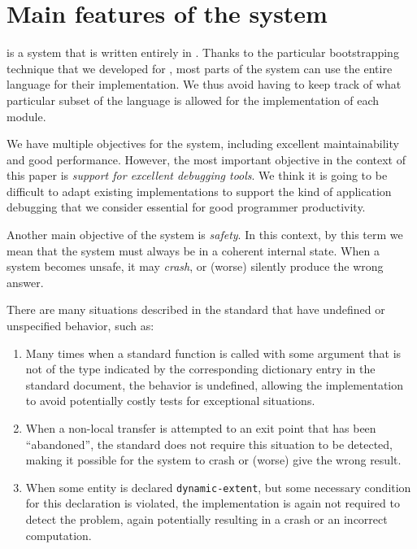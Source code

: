 \section{Main features of the \sicl{} system}
\label{sec-sicl-features}

\sicl{} is a system that is written entirely in \commonlisp{}.  Thanks
to the particular bootstrapping technique
\cite{durand_irene_2019_2634314} that we developed for \sicl{}, most
parts of the system can use the entire language for their
implementation.  We thus avoid having to keep track of what particular
subset of the language is allowed for the implementation of each
module.

We have multiple objectives for the \sicl{} system, including
excellent maintainability and good performance.  However, the most
important objective in the context of this paper is \emph{support for
  excellent debugging tools}.  We think it is going to be difficult to
adapt existing \commonlisp{} implementations to support the kind of
application debugging that we consider essential for good programmer
productivity.

Another main objective of the \sicl{} system is \emph{safety}.  In
this context, by this term we mean that the system must always be in a
coherent internal state.  When a system becomes unsafe, it may
\emph{crash}, or (worse) silently produce the wrong answer.

There are many situations described in the \commonlisp{} standard that
have undefined or unspecified behavior, such as:

\begin{enumerate}
\item Many times when a standard function is called with some argument
  that is not of the type indicated by the corresponding dictionary
  entry in the \commonlisp{} standard document, the behavior is
  undefined, allowing the implementation to avoid potentially costly
  tests for exceptional situations.
\item When a non-local transfer is attempted to an exit point that has
  been ``abandoned'', the standard does not require this situation to
  be detected, making it possible for the system to crash or (worse)
  give the wrong result.
\item When some entity is declared \texttt{dynamic-extent}, but some
  necessary condition for this declaration is violated, the
  implementation is again not required to detect the problem, again
  potentially resulting in a crash or an incorrect computation.
\end{enumerate}

